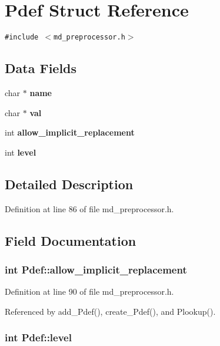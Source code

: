 \section{Pdef Struct Reference}
\label{structPdef}
{\tt \#include $<$md\_\-preprocessor.h$>$}

\subsection*{Data Fields}
\begin{CompactItemize}
\item 
char $\ast$ \bf{name}
\item 
char $\ast$ \bf{val}
\item 
int \bf{allow\_\-implicit\_\-replacement}
\item 
int \bf{level}
\end{CompactItemize}


\subsection{Detailed Description}




Definition at line 86 of file md\_\-preprocessor.h.

\subsection{Field Documentation}
\subsubsection{\setlength{\rightskip}{0pt plus 5cm}int \bf{Pdef::allow\_\-implicit\_\-replacement}}\label{structPdef_e7e2956c4ab9f4348c3ff02da425c9d7}




Definition at line 90 of file md\_\-preprocessor.h.

Referenced by add\_\-Pdef(), create\_\-Pdef(), and Plookup().
\subsubsection{\setlength{\rightskip}{0pt plus 5cm}int \bf{Pdef::level}}\label{structPdef_585c031c810048a941a33e1873be3819}




